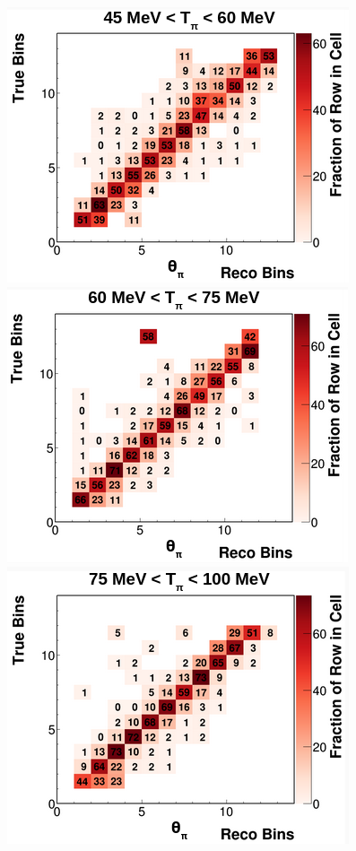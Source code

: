\begin{figure}[!htb]
    \includegraphics[scale=0.33]{Figures/Chapter4/SignalDefinition/thetapi45to60tpi.png}
    \includegraphics[scale=0.33]{Figures/Chapter4/SignalDefinition/thetapi60to75tpi.png}
    \includegraphics[scale=0.33]{Figures/Chapter4/SignalDefinition/thetapi75to100tpi.png}

\end{figure}
